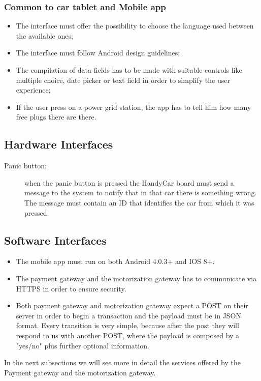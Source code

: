 \subsubsection*{Common to car tablet and Mobile app}
	\begin{itemize}
	\item The interface must offer the possibility to choose the language used between the available ones;
	\item The interface must follow Android design guidelines;
	\item The compilation of data fields has to be made with suitable controls like multiple choice, date picker or text field in order to simplify the user experience;
	\item If the user press on a power grid station, the app has to tell him how many free plugs there are there.
	\end{itemize}

\subsection{Hardware Interfaces}
\begin{description}
	\item [Panic button:] when the panic button is pressed the HandyCar board must send a message to the system to notify that in that car there is something wrong. The message must contain an ID that identifies the car from which it was pressed.
\end{description}

\subsection{Software Interfaces}
\begin{itemize}
\item The mobile app must run on both Android 4.0.3+ and IOS 8+.
\item The payment gateway and the motorization gateway has to communicate via HTTPS in order to ensure security.
\item Both payment gateway and motorization gateway expect a POST on their server in order to begin a transaction and the payload must be in JSON format. Every transition is very simple, because after the post they will respond to us with another POST, where the payload is composed by a "yes/no" plus further optional information.
\end{itemize}

In the next subsections we will see more in detail the services offered by the Payment gateway and the motorization gateway.

